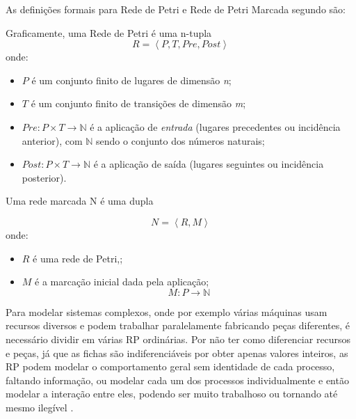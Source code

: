 As definições formais para Rede de Petri e Rede de Petri Marcada segundo \citet{cardoso1997redes} são:

\begin{definition}
\label{drp}
Graficamente, uma Rede de Petri é uma n-tupla
\begin{equation}
R = \left \langle P, T, Pre, Post \right \rangle
\end{equation}
onde:
\begin{itemize}
\item $P$ é um conjunto finito de lugares de dimensão \textit{n};
\item $T$ é um conjunto finito de transições de dimensão \textit{m};
\item $Pre : P \times T \rightarrow \mathbb{N}$   é a aplicação de \textit{entrada} (lugares precedentes ou incidência anterior), com $\mathbb{N}$ sendo o conjunto dos números naturais;
\item $Post : P \times T \rightarrow \mathbb{N}$ é a aplicação de saída (lugares seguintes ou incidência posterior).
\end{itemize}
\end{definition}

\begin{definition}
  \label{drpmarcada}
  Uma rede marcada N é uma dupla

  \begin{equation}
      N = \left \langle R,M \right \rangle
  \end{equation}
  onde:
  \begin{itemize}
  \item $R$ é uma rede de Petri,;
  \item $M$ é a marcação inicial dada pela aplicação;
    \begin{equation}
        M : P \rightarrow \mathbb{N}
    \end{equation}
  \end{itemize}
\end{definition}

Para modelar sistemas complexos, onde por exemplo várias máquinas usam recursos diversos e podem trabalhar paralelamente fabricando peças diferentes,  é necessário dividir em várias RP ordinárias. Por não ter como diferenciar recursos e peças, já que as fichas são indiferenciáveis por obter apenas valores inteiros, as RP podem modelar o comportamento geral sem identidade de cada processo, faltando informação, ou modelar cada um dos processos individualmente e então modelar a interação entre eles, podendo ser muito trabalhoso ou tornando até mesmo ilegível \cite{cardoso1997redes, jensen2013coloured}.

